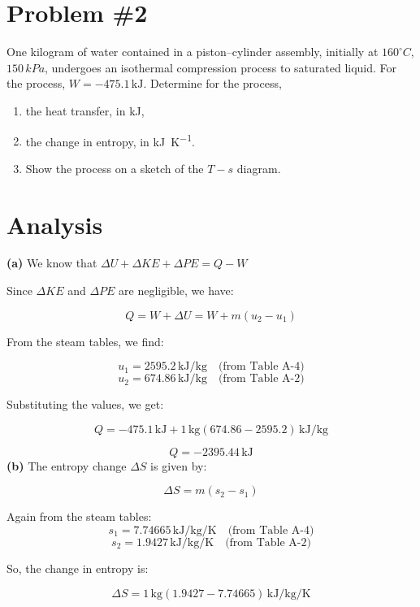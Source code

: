 \documentclass[11pt, letterpaper]{article}
\begin{document}
\newpage
\section*{Problem \#2}
One kilogram of water contained in a piston–cylinder assembly, initially at \( 160^\circ C \), \( 150 \, kPa \), undergoes an isothermal compression process to saturated liquid. For the process, \( W = -475.1 \, \si{\kilo\joule} \). Determine for the process,

\begin{enumerate}[label=\alph*.]
    \item the heat transfer, in \si{\kilo\joule},
    \item the change in entropy, in \si{\kilo\joule\per\kelvin}.
    \item Show the process on a sketch of the \( T-s \) diagram.
\end{enumerate}

\section*{Analysis}

\textbf{(a)} We know that \( \Delta U + \Delta KE + \Delta PE = Q - W \)

Since \( \Delta KE \) and \( \Delta PE \) are negligible, we have:

\[ Q = W + \Delta U = W + m(u_2 - u_1) \]

From the steam tables, we find:

\[ u_1 = 2595.2 \, \si{\kilo\joule\per\kilogram} \quad \text{(from Table A-4)} \]
\[ u_2 = 674.86 \, \si{\kilo\joule\per\kilogram} \quad \text{(from Table A-2)} \]


Substituting the values, we get:

\[ Q = -475.1 \, \si{\kilo\joule} + 1 \, \si{\kilogram}(674.86 - 2595.2) \, \si{\kilo\joule\per\kilogram} \]

\[ Q = -2395.44 \, \si{\kilo\joule} \]
\newline
\textbf{(b)} The entropy change \( \Delta S \) is given by:

\[ \Delta S = m(s_2 - s_1) \]

Again from the steam tables:
\[ s_1 = 7.74665 \, \si{\kilo\joule\per\kilogram\per\kelvin} \quad \text{(from Table A-4)} \]
\[ s_2 = 1.9427 \, \si{\kilo\joule\per\kilogram\per\kelvin} \quad \text{(from Table A-2)} \]

So, the change in entropy is:

\[ \Delta S = 1 \, \si{\kilogram}(1.9427 - 7.74665) \, \si{\kilo\joule\per\kilogram\per\kelvin} \]
\end{document}
